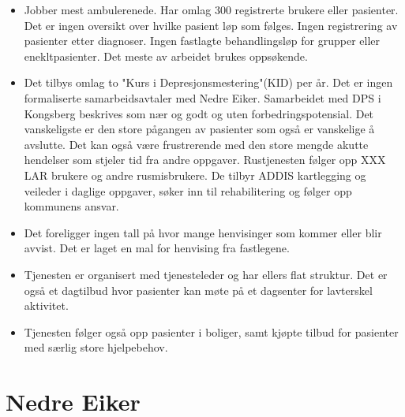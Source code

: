 \documentclass[11pt]{report} %
\begin{document}
          \begin{itemize}
      	      \item Jobber mest ambulerenede. Har omlag 300 registrerte brukere eller pasienter. Det er ingen oversikt over hvilke pasient løp som følges. Ingen registrering av pasienter etter  diagnoser. Ingen fastlagte behandlingsløp for grupper eller enekltpasienter. Det meste av arbeidet brukes oppsøkende. 
              \item Det tilbys omlag to "Kurs i Depresjonsmestering"(KID) per år. Det er ingen formaliserte samarbeidsavtaler med Nedre Eiker. Samarbeidet med DPS i Kongsberg beskrives som nær og godt og uten forbedringspotensial. Det vanskeligste er den store pågangen av pasienter som også er vanskelige å avslutte. Det kan også være frustrerende med den store mengde akutte hendelser som stjeler tid fra andre oppgaver. Rustjenesten følger opp XXX LAR brukere og andre rusmisbrukere. De tilbyr ADDIS kartlegging og veileder i daglige oppgaver, søker inn til rehabilitering og følger opp kommunens ansvar.
              \item Det foreligger ingen tall på hvor mange henvisinger som kommer eller blir avvist. Det er laget en mal for henvising fra fastlegene. 
              \item Tjenesten er organisert med tjenesteleder og har ellers flat struktur. Det er også et dagtilbud hvor pasienter kan møte på et dagsenter for lavterskel aktivitet. 
              \item Tjenesten følger også opp pasienter i boliger, samt kjøpte tilbud for pasienter med særlig store hjelpebehov. 
                \end{itemize}
      

    \section{Nedre Eiker}\label{sec:org_nek}
\end{document}
